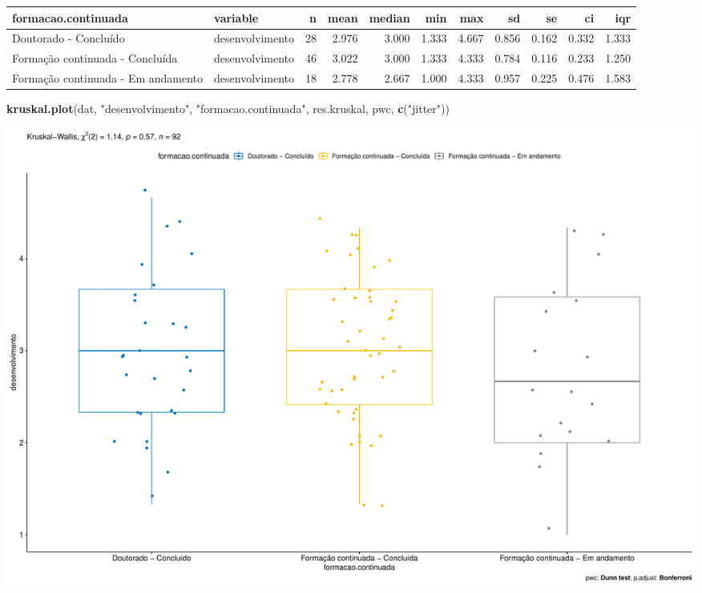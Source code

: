 \documentclass[]{article}
\newenvironment{Shaded}{\begin{snugshade}}{\end{snugshade}}
\newcommand{\KeywordTok}[1]{\textcolor[rgb]{0.13,0.29,0.53}{\textbf{#1}}}
\newcommand{\NormalTok}[1]{#1}
\newcommand{\StringTok}[1]{\textcolor[rgb]{0.31,0.60,0.02}{#1}}
\begin{document}
\begin{longtable}[]{@{}llrrrrrrrrr@{}}
\toprule
formacao.continuada & variable & n & mean & median & min & max & sd & se
& ci & iqr\tabularnewline
\midrule
\endhead
Doutorado - Concluído & desenvolvimento & 28 & 2.976 & 3.000 & 1.333 &
4.667 & 0.856 & 0.162 & 0.332 & 1.333\tabularnewline
Formação continuada - Concluída & desenvolvimento & 46 & 3.022 & 3.000 &
1.333 & 4.333 & 0.784 & 0.116 & 0.233 & 1.250\tabularnewline
Formação continuada - Em andamento & desenvolvimento & 18 & 2.778 &
2.667 & 1.000 & 4.333 & 0.957 & 0.225 & 0.476 & 1.583\tabularnewline
\bottomrule
\end{longtable}

\begin{Shaded}
\begin{Highlighting}[]
\KeywordTok{kruskal.plot}\NormalTok{(dat, }\StringTok{"desenvolvimento"}\NormalTok{, }\StringTok{"formacao.continuada"}\NormalTok{, res.kruskal, pwc, }\KeywordTok{c}\NormalTok{(}\StringTok{"jitter"}\NormalTok{))}
\end{Highlighting}
\end{Shaded}

\includegraphics{kruskal_files/figure-latex/unnamed-chunk-5-1.pdf}
\end{document}

